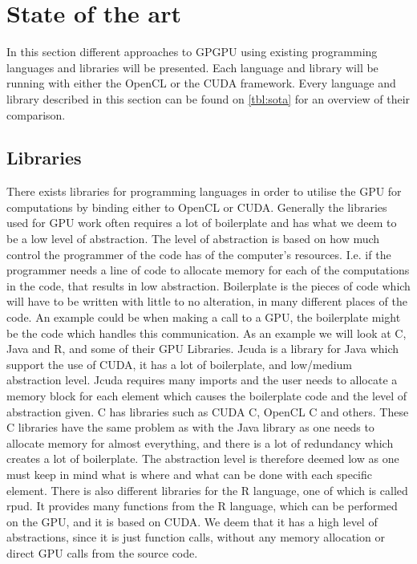 \section{State of the art} %
\label{sec:state_of_the_art}
In this section different approaches to GPGPU using existing programming languages and libraries will be presented.
Each language and library will be running with either the OpenCL or the CUDA framework.
Every language and library described in this section can be found on \ref{tbl:sota} for an overview of their comparison.
      

\subsection{Libraries} 
There exists libraries for programming languages in order to utilise the GPU for computations by binding either to OpenCL or CUDA.
Generally the libraries used for GPU work often requires a lot of boilerplate and has what we deem to be a low level of abstraction.
The level of abstraction is based on how much control the programmer of the code has of the computer's resources.
I.e. if the programmer needs a line of code to allocate memory for each of the computations in the code, that results in low abstraction.
Boilerplate is the pieces of code which will have to be written with little to no alteration, in many different places of the code.
An example could be when making a call to a GPU, the boilerplate might be the code which handles this communication.
As an example we will look at C, Java and R, and some of their GPU Libraries.
Jcuda is a library for Java which support the use of CUDA, it has a lot of boilerplate, and low/medium abstraction level\citep{Java_library}. 
Jcuda requires many imports and the user needs to allocate a memory block for each element which causes the boilerplate code and the level of abstraction given.\citep{Java_malloc}
C has libraries such as CUDA C, OpenCL C and others.
These C libraries have the same problem as with the Java library as one needs to allocate memory for almost everything, and there is a lot of redundancy which creates a lot of boilerplate.
The abstraction level is therefore deemed low as one must keep in mind what is where and what can be done with each specific element.\citep{C_CUDA} 
There is also different libraries for the R language, one of which is called rpud.
It provides many functions from the R language, which can be performed on the GPU, and it is based on CUDA.
We deem that it has a high level of abstractions, since it is just function calls, without any memory allocation or direct GPU calls from the source code.                                                  


